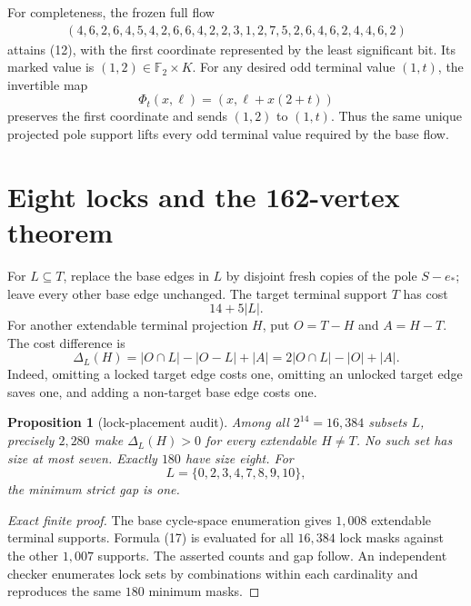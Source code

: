 \documentclass[11pt]{article}
\newtheorem{proposition}[theorem]{Proposition}
\theoremstyle{definition}
\theoremstyle{remark}
\newcommand{\F}{\mathbb F}
\begin{document}
For completeness, the frozen full flow
\[
\begin{split}
(4,6,2,6,4,5,4,2,6,6,4,2,2,3,1,2,7,5,2,6,4,6,2,4,4,6,2)
\end{split}                                                \tag{14}
\]
attains (12), with the first coordinate represented by the least
significant bit.  Its marked value is \((1,2)\in\F_2\times K\).
For any desired odd terminal value \((1,t)\), the invertible map
\[
                 \Phi_t(x,\ell)=(x,\ell+x(2+t))           \tag{15}
\]
preserves the first coordinate and sends \((1,2)\) to \((1,t)\).
Thus the same unique projected pole support lifts every odd terminal
value required by the base flow.

\section{Eight locks and the 162-vertex theorem}

For \(L\subseteq T\), replace the base edges in \(L\) by disjoint fresh
copies of the pole \(S-e_*\); leave every other base edge unchanged.
The target terminal support \(T\) has cost
\[
                              14+5|L|.                    \tag{16}
\]
For another extendable terminal projection \(H\), put
\(O=T-H\) and \(A=H-T\).  The cost difference is
\[
 \Delta_L(H)
   =|O\cap L|-|O-L|+|A|
   =2|O\cap L|-|O|+|A|.                                  \tag{17}
\]
Indeed, omitting a locked target edge costs one, omitting an unlocked
target edge saves one, and adding a non-target base edge costs one.

\begin{proposition}[lock-placement audit]\label{prop:placements}
Among all \(2^{14}=16{,}384\) subsets \(L\), precisely \(2{,}280\)
make \(\Delta_L(H)>0\) for every extendable \(H\ne T\).
No such set has size at most seven.  Exactly \(180\) have size eight.
For
\[
                         L=\{0,2,3,4,7,8,9,10\},          \tag{18}
\]
the minimum strict gap is one.
\end{proposition}

\begin{proof}[Exact finite proof]
The base cycle-space enumeration gives \(1{,}008\) extendable terminal
supports.  Formula (17) is evaluated for all \(16{,}384\) lock masks
against the other \(1{,}007\) supports.  The asserted counts and gap
follow.  An independent checker enumerates lock sets by combinations
within each cardinality and reproduces the same \(180\) minimum masks.
\end{proof}
\end{document}
